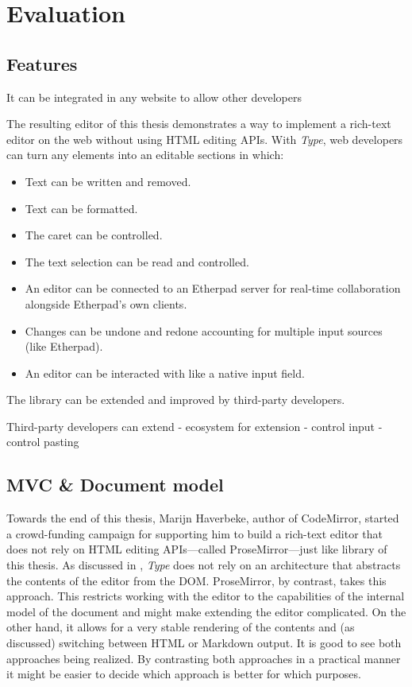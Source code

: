 
\chapter{Evaluation}
\label{ch:evaluation}


\section{Features}

It can be integrated in any website to allow other developers

The resulting editor of this thesis demonstrates a way to implement a rich-text editor on the web without using HTML editing APIs. With \textit{Type}, web developers can turn any elements into an editable sections in which:


\begin{itemize}
\item Text can be written and removed.
\item Text can be formatted.
\item The caret can be controlled.
\item The text selection can be read and controlled.
\item An editor can be connected to an Etherpad server for real-time collaboration alongside Etherpad's own clients.
\item Changes can be undone and redone accounting for multiple input sources (like Etherpad).
\item An editor can be interacted with like a native input field.
\end{itemize}


 
The library can be extended and improved by third-party developers.
 
Third-party developers can extend
 - ecosystem for extension
 - control input
 - control pasting
 
\section{MVC \& Document model}

Towards the end of this thesis, Marijn Haverbeke, author of CodeMirror, started a crowd-funding campaign for supporting him to build a rich-text editor that does not rely on HTML editing APIs---called ProseMirror---just like library of this thesis. As discussed in , \textit{Type} does not rely on an architecture that abstracts the contents of the editor from the DOM. ProseMirror, by contrast, takes this approach. This restricts working with the editor to the capabilities of the internal model of the document and might make extending the editor complicated. On the other hand, it allows for a very stable rendering of the contents and (as discussed) switching between HTML or Markdown output. It is good to see both approaches being realized. By contrasting both approaches in a practical manner it might be easier to decide which approach is better for which purposes.

